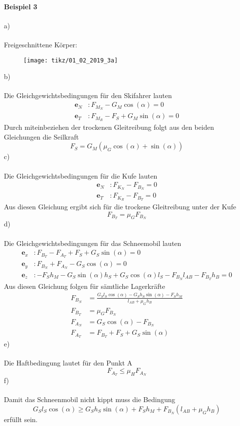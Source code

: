 \newpage
\noindent
\textbf{Beispiel 3}\\ \\
a)\\ \\
Freigeschnittene Körper:
\begin{figure}[h]
	\centering
	\texttt{[image: tikz/01\_02\_2019\_3a]}
\end{figure}
b)\\ \\ 
Die Gleichgewichtsbedingungen für den Skifahrer lauten
\begin{align*}
	\textbf{e}_N &: F_{M_N} - G_M\cos(\alpha) = 0\\
	\textbf{e}_T &: F_{M_R} - F_S + G_M\sin(\alpha) = 0
\end{align*}
Durch miteinbeziehen der trockenen Gleitreibung folgt aus den beiden Gleichungen die Seilkraft
\[
	F_S = G_M(\mu_G\cos(\alpha) + \sin(\alpha))
\]
c)\\ \\
Die Gleichgewichtsbedingungen für die Kufe lauten
\begin{align*}
	\textbf{e}_N &: F_{K_N} - F_{B_N} = 0\\
	\textbf{e}_T &: F_{K_R} - F_{B_T} = 0
\end{align*}
Aus diesen Gleichung ergibt sich für die trockene Gleitreibung unter der Kufe
\[
	F_{B_T} = \mu_G F_{B_N}
\]
d)\\ \\
Die Gleichgewichtsbedingungen für das Schneemobil lauten
\begin{align*}
	\textbf{e}_x &: F_{B_T} - F_{A_T} + F_S + G_S\sin(\alpha) = 0\\
	\textbf{e}_y &: F_{B_N} + F_{A_N} - G_S\cos(\alpha) = 0\\
	\textbf{e}_z &: -F_Sh_M - G_S\sin(\alpha)h_S + G_S\cos(\alpha)l_S - F_{B_N}l_{AB} - F_{B_T}h_B = 0
\end{align*}
\newpage
\noindent
Aus diesen Gleichung folgen für sämtliche Lagerkräfte
\begin{align*}
	F_{B_N} &= \frac{G_Sl_S\cos(\alpha) - G_Sh_S\sin(\alpha) - F_Sh_M}{l_{AB} + \mu_Gh_B} \\
	F_{B_T} &= \mu_GF_{B_N} \\
	F_{A_N} &= G_S\cos(\alpha) - F_{B_N} \\
	F_{A_T} &= F_{B_T} + F_S + G_S\sin(\alpha)
\end{align*}
e)\\ \\
Die Haftbedingung lautet für den Punkt A
\[
	F_{A_T} \leq \mu_H F_{A_N}
\]
f)\\ \\
Damit das Schneenmobil nicht kippt muss die Bedingung
\[
	G_Sl_S\cos(\alpha) \geq G_Sh_S\sin(\alpha) + F_Sh_M + F_{B_N}(l_{AB} + \mu_Gh_B)
\]
erfüllt sein.\\ \\

